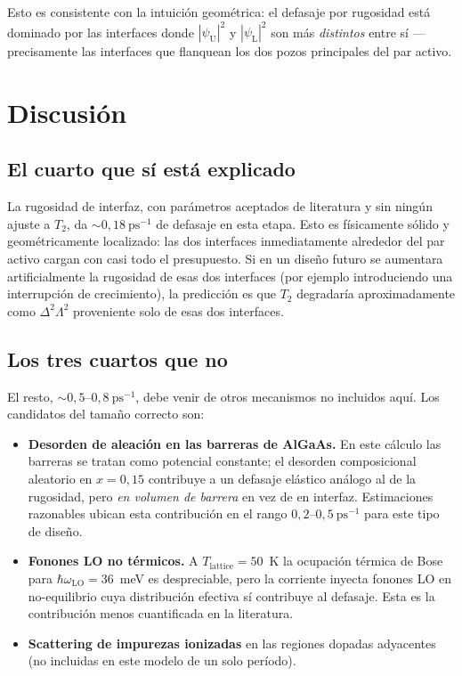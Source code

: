\documentclass[11pt,a4paper]{article}
\begin{document}
Esto es consistente con la intuición geométrica: el defasaje por rugosidad
está dominado por las interfaces donde $|\psi_\mathrm{U}|^2$ y $|\psi_\mathrm{L}|^2$
son más \emph{distintos} entre sí --- precisamente las interfaces que
flanquean los dos pozos principales del par activo.

\section{Discusión}

\subsection{El cuarto que sí está explicado}

La rugosidad de interfaz, con parámetros aceptados de literatura y sin
ningún ajuste a $T_2$, da $\sim\!0{,}18~\mathrm{ps}^{-1}$ de defasaje en
esta etapa. Esto es físicamente sólido y geométricamente localizado:
las dos interfaces inmediatamente alrededor del par activo cargan con
casi todo el presupuesto. Si en un diseño futuro se aumentara
artificialmente la rugosidad de esas dos interfaces (por ejemplo
introduciendo una interrupción de crecimiento), la predicción es que
$T_2$ degradaría aproximadamente como $\Delta^2 \Lambda^2$ proveniente
solo de esas dos interfaces.

\subsection{Los tres cuartos que no}

El resto, $\sim\!0{,}5$--$0{,}8~\mathrm{ps}^{-1}$, debe venir de otros
mecanismos no incluidos aquí. Los candidatos del tamaño correcto son:
\begin{itemize}
  \item \textbf{Desorden de aleación en las barreras de AlGaAs.} En este
        cálculo las barreras se tratan como potencial constante; el
        desorden composicional aleatorio en $x = 0{,}15$ contribuye a un
        defasaje elástico análogo al de la rugosidad, pero \emph{en volumen
        de barrera} en vez de en interfaz. Estimaciones razonables ubican
        esta contribución en el rango $0{,}2$--$0{,}5~\mathrm{ps}^{-1}$ para
        este tipo de diseño.
  \item \textbf{Fonones LO no térmicos.} A $T_\mathrm{lattice} = 50$~K la
        ocupación térmica de Bose para $\hbar\omega_\mathrm{LO} = 36$~meV
        es despreciable, pero la corriente inyecta fonones LO en
        no-equilibrio cuya distribución efectiva sí contribuye al
        defasaje. Esta es la contribución menos cuantificada en la
        literatura.
  \item \textbf{Scattering de impurezas ionizadas} en las regiones dopadas
        adyacentes (no incluidas en este modelo de un solo período).
\end{itemize}
\end{document}
